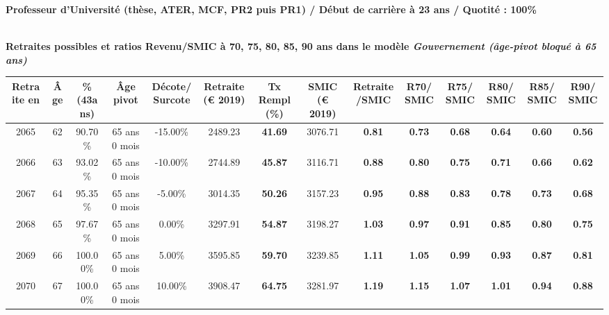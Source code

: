 {\bf \noindent Professeur d'Université (thèse, ATER, MCF, PR2 puis PR1) / Début de carrière à 23 ans / Quotité : 100\%}  ~ 

 ~\\{\bf \noindent Retraites possibles et ratios Revenu/SMIC à 70, 75, 80, 85, 90 ans dans le modèle \emph{Gouvernement (âge-pivot bloqué à 65 ans)}}  
 
\begin{adjustbox}{max width=\textwidth} 
\begin{tabular}[htb]{|c|c||c|c|c||c|c||c|c||c|c|c|c|c|} 
\hline 
 Retraite en &  Âge &  \%(43ans) &  Âge pivot &  Décote/Surcote &  Retraite (\euro{} 2019) &  Tx Rempl(\%) &  SMIC (\euro{} 2019) &  Retraite/SMIC &  R70/SMIC &  R75/SMIC &  R80/SMIC &  R85/SMIC &  R90/SMIC \\ 
\hline \hline 
 2065 &  62 &  90.70\% &  65 ans 0 mois &  -15.00\% &  2489.23 &  {\bf 41.69} &  3076.71 &  {\bf {\color{red} 0.81}} &  {\bf {\color{red} 0.73}} &  {\bf {\color{red} 0.68}} &  {\bf {\color{red} 0.64}} &  {\bf {\color{red} 0.60}} &  {\bf {\color{red} 0.56}} \\ 
\hline 
 2066 &  63 &  93.02\% &  65 ans 0 mois &  -10.00\% &  2744.89 &  {\bf 45.87} &  3116.71 &  {\bf {\color{red} 0.88}} &  {\bf {\color{red} 0.80}} &  {\bf {\color{red} 0.75}} &  {\bf {\color{red} 0.71}} &  {\bf {\color{red} 0.66}} &  {\bf {\color{red} 0.62}} \\ 
\hline 
 2067 &  64 &  95.35\% &  65 ans 0 mois &  -5.00\% &  3014.35 &  {\bf 50.26} &  3157.23 &  {\bf {\color{red} 0.95}} &  {\bf {\color{red} 0.88}} &  {\bf {\color{red} 0.83}} &  {\bf {\color{red} 0.78}} &  {\bf {\color{red} 0.73}} &  {\bf {\color{red} 0.68}} \\ 
\hline 
 2068 &  65 &  97.67\% &  65 ans 0 mois &  0.00\% &  3297.91 &  {\bf 54.87} &  3198.27 &  {\bf 1.03} &  {\bf {\color{red} 0.97}} &  {\bf {\color{red} 0.91}} &  {\bf {\color{red} 0.85}} &  {\bf {\color{red} 0.80}} &  {\bf {\color{red} 0.75}} \\ 
\hline 
 2069 &  66 &  100.00\% &  65 ans 0 mois &  5.00\% &  3595.85 &  {\bf 59.70} &  3239.85 &  {\bf 1.11} &  {\bf 1.05} &  {\bf {\color{red} 0.99}} &  {\bf {\color{red} 0.93}} &  {\bf {\color{red} 0.87}} &  {\bf {\color{red} 0.81}} \\ 
\hline 
 2070 &  67 &  100.00\% &  65 ans 0 mois &  10.00\% &  3908.47 &  {\bf 64.75} &  3281.97 &  {\bf 1.19} &  {\bf 1.15} &  {\bf 1.07} &  {\bf 1.01} &  {\bf {\color{red} 0.94}} &  {\bf {\color{red} 0.88}} \\ 
\hline 
\hline 
\end{tabular} 
\end{adjustbox} 
 
